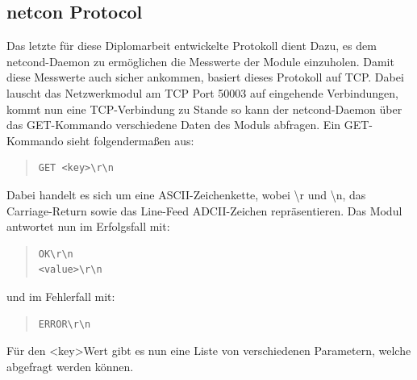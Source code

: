 \documentclass[a4paper,14pt,headsepline]{scrartcl}
\begin{document}
\subsection{netcon Protocol}
Das letzte für diese Diplomarbeit entwickelte Protokoll dient Dazu, es dem netcond-Daemon zu ermöglichen die Messwerte der Module einzuholen. Damit diese Messwerte auch sicher ankommen, basiert dieses Protokoll auf TCP. Dabei lauscht das Netzwerkmodul am TCP Port 50003 auf eingehende Verbindungen, kommt nun eine TCP-Verbindung zu Stande so kann der netcond-Daemon über das GET-Kommando verschiedene Daten des Moduls abfragen. Ein GET-Kommando sieht folgendermaßen aus:

\begin{quote}
\begin{verbatim}
GET <key>\r\n
\end{verbatim}
\end{quote}

Dabei handelt es sich um eine ASCII-Zeichenkette, wobei \textbackslash r und \textbackslash n, das Carriage-Return sowie das Line-Feed ADCII-Zeichen repräsentieren. Das Modul antwortet nun im Erfolgsfall mit:
\begin{quote}
\begin{verbatim}
OK\r\n
<value>\r\n
\end{verbatim}
\end{quote}
und im Fehlerfall mit:
\begin{quote}
\begin{verbatim}
ERROR\r\n
\end{verbatim}
\end{quote}

Für den \textless key\textgreater Wert gibt es nun eine Liste von verschiedenen Parametern, welche abgefragt werden können.
\end{document}

